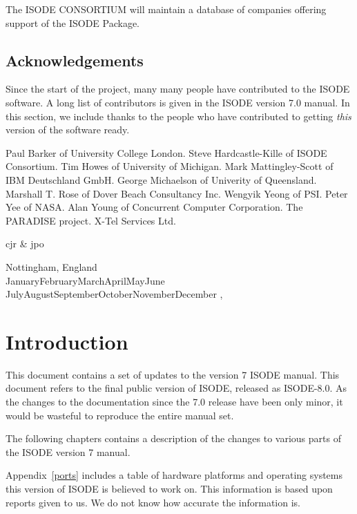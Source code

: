 The ISODE CONSORTIUM will maintain a database of companies
offering support of the ISODE Package.


\newpage\section*{Acknowledgements}

Since the start of the project, many many people have contributed to
the ISODE software.  A long list of contributors is given in the ISODE
version 7.0 manual.  In this section, we include thanks to the people
who have contributed to getting {\em this} version of the software ready.

Paul Barker of University College London.
Steve Hardcastle-Kille of ISODE Consortium.
Tim Howes of University of Michigan.
Mark Mattingley-Scott of IBM Deutschland GmbH.
George Michaelson of Univerity of Queensland.
Marshall T. Rose of Dover Beach Consultancy Inc.
Wengyik Yeong of PSI.
Peter Yee of NASA.
Alan Young of Concurrent Computer Corporation. 
The PARADISE project.
X-Tel Services Ltd.


\vspace{0.25in}
{\raggedleft cjr \& jpo \par}
{\raggedright Nottingham, England\\
\ifcase\month
    \number\month\or
    January\or February\or March\or April\or May\or June\or
    July\or August\or September\or October\or November\or December\else
\number\month\fi,
{\oldstyle\number\year}\par}

\newpage
\ifodd\value{page} \else
    \mbox{}
    \newpage
\fi
{}


\chapter{Introduction}


This document contains a set of updates to the version 7 ISODE manual.
This document refers to the final public version of ISODE, released as
ISODE-8.0.  As the changes to the documentation since the 7.0 release
have been only minor, it would be wasteful to reproduce the entire
manual set.

The following chapters contains a description of the changes to
various parts of the ISODE version 7 manual.

Appendix~\ref{ports} includes a table of hardware platforms and
operating systems this version of ISODE is believed to work on.  This
information is based upon reports given to us.  We do not know how
accurate the information is.

